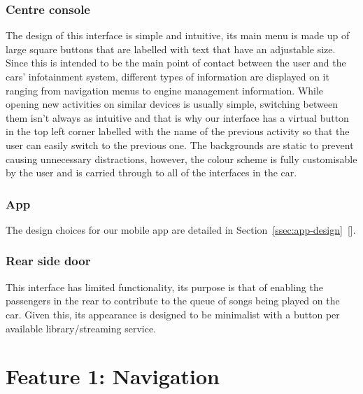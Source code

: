 \documentclass{article}
\begin{document}
\subsubsection{Centre console}\label{sssec:centre-console-aestethics}
The design of this interface is simple and intuitive, its main menu is made up of large square buttons that are labelled with text that have an adjustable size. Since this is intended to be the main point of contact between the user and the cars' infotainment system, different types of information are displayed on it ranging from navigation menus to engine management information. While opening new activities on similar devices is usually simple, switching between them isn't always as intuitive and that is why our interface has a virtual button in the top left corner labelled with the name of the previous activity so that the user can easily switch to the previous one. The backgrounds are static to prevent causing unnecessary distractions, however, the colour scheme is fully customisable by the user and is carried through to all of the interfaces in the car.

\subsubsection{App}\label{sssec:app-aestethics}
The design choices for our mobile app are detailed in Section~\ref{ssec:app-design}~[].
\subsubsection{Rear side door}\label{sssec:rear-door-device-aestethics}
This interface has limited functionality, its purpose is that of enabling the passengers in the rear to contribute to the queue of songs being played on the car. Given this, its appearance is designed to be minimalist with a button per available library/streaming service.

%
%
\section{Feature 1: Navigation}\label{sec:nav}
\end{document}
